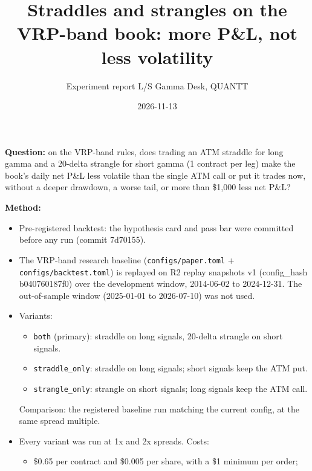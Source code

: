\documentclass{article}
\title{Straddles and strangles on the VRP-band book: more P\&L, not less volatility}
\author{Experiment report \textperiodcentered{} L/S Gamma Desk, QUANTT}
\date{2026-11-13}
\begin{document}
\maketitle

\textbf{Question:} on the VRP-band rules, does trading an ATM straddle for long gamma and a 20-delta strangle for short gamma (1 contract per leg) make the book's daily net P\&L less volatile than the single ATM call or put it trades now, without a deeper drawdown, a worse tail, or more than \$1,000 less net P\&L?

\textbf{Method:}

\begin{itemize}

\item Pre-registered backtest: the hypothesis card and pass bar were committed before any run (commit 7d70155).

\item The VRP-band research baseline (\texttt{configs/\allowbreak{}paper.\allowbreak{}toml} + \texttt{configs/\allowbreak{}backtest.\allowbreak{}toml}) is replayed on R2 replay snapshots v1 (config\_hash b040760187f0) over the development window, 2014-06-02 to 2024-12-31. The out-of-sample window (2025-01-01 to 2026-07-10) was not used.

\item Variants:

\begin{itemize}

\item \texttt{both} (primary): straddle on long signals, 20-delta strangle on short signals.

\item \texttt{straddle\_\allowbreak{}only}: straddle on long signals; short signals keep the ATM put.

\item \texttt{strangle\_\allowbreak{}only}: strangle on short signals; long signals keep the ATM call.

\end{itemize}

Comparison: the registered baseline run matching the current config, at the same spread multiple.

\item Every variant was run at 1x and 2x spreads. Costs:

\begin{itemize}

\item \$0.65 per contract and \$0.005 per share, with a \$1 minimum per order;


\end{itemize}
\end{itemize}
\end{document}
